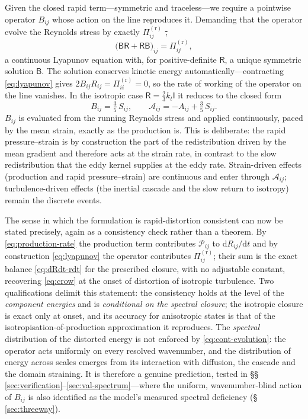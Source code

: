 \documentclass[lineno]{JFM-FLM_Au}
\providecommand{\DIFadd}[1]{{\protect\color{blue}\uwave{#1}}} %
\providecommand{\DIFdel}[1]{{\protect\color{red}\sout{#1}}} %
\providecommand{\DIFaddbegin}{} %
\providecommand{\DIFaddend}{} %
\providecommand{\DIFdelbegin}{} %
\providecommand{\DIFdelend}{} %
\begin{document}
Given the closed rapid term---symmetric and traceless---we require a
pointwise operator $B_{ij}$ whose action on the line reproduces it.
Demanding that the operator evolve the Reynolds stress by exactly
$\Pi^{(\mathrm r)}_{ij}$ \DIFdelbegin \DIFdel{,
}\DIFdelend \DIFaddbegin \DIFadd{implies
}\DIFaddend \begin{equation}
  \big(\mathsf{B}\mathsf{R}+\mathsf{R}\mathsf{B}\big)_{ij}
  = \Pi^{(\mathrm r)}_{ij},
  \label{eq:lyapunov}
\end{equation}
a continuous Lyapunov equation with, for positive-definite
$\mathsf{R}$, a unique symmetric solution $\mathsf{B}$. The solution
conserves kinetic energy automatically---contracting \eqref{eq:lyapunov}
gives $2B_{ij}R_{ij}=\Pi^{(\mathrm r)}_{ii}=0$, so the rate of working of
the operator on the line vanishes. In the isotropic case
$\mathsf{R}=\tfrac23k_t\mathsf{I}$ it reduces to the closed form
\begin{equation}
  B_{ij} = \tfrac{3}{5}\,S_{ij},
  \qquad
  \mathcal{A}_{ij} = -A_{ij} + \tfrac{3}{5}\,S_{ij}.
  \label{eq:iso-B}
\end{equation}
$B_{ij}$ is evaluated from the running Reynolds stress and applied
continuously, paced by the mean strain, exactly as the production is.
This is deliberate: the rapid pressure--strain is by construction the
part of the redistribution driven by the mean gradient and therefore acts
at the strain rate, in contrast to the slow redistribution that the eddy
kernel supplies at the eddy rate. Strain-driven effects (production and
rapid pressure--strain) are continuous and enter through
$\mathcal{A}_{ij}$; turbulence-driven effects (the inertial cascade and
the slow return to isotropy) remain the discrete events.

The sense in which the formulation is rapid-distortion consistent can now
be stated precisely, again as a consistency check rather than a theorem.
By \eqref{eq:production-rate} the production term contributes
$\mathcal{P}_{ij}$ to $\mathrm{d}R_{ij}/\mathrm{d}t$ and by construction
\eqref{eq:lyapunov} the operator contributes $\Pi^{(\mathrm r)}_{ij}$;
their sum is the exact balance \eqref{eq:dRdt-rdt} for the prescribed
closure, with no adjustable constant, recovering \eqref{eq:crow} at the
onset of distortion of isotropic turbulence. Two qualifications delimit
this statement: the consistency holds at the level of the
\emph{component energies} and is \emph{conditional on the
spectral closure}; the isotropic closure is exact only at onset, and its
accuracy for anisotropic states is that of the
isotropisation-of-production approximation it reproduces. The
\emph{spectral} distribution of the distorted energy is not enforced by
\eqref{eq:cont-evolution}: the operator acts uniformly on every resolved
wavenumber, and the distribution of energy across scales emerges from
its interaction with diffusion, the cascade and the domain straining. It
is therefore a genuine prediction, tested in
\S\S\,\ref{sec:verification}--\ref{sec:val-spectrum}---where the
uniform, wavenumber-blind action of $B_{ij}$ is also identified as the
model's measured spectral deficiency (\S\,\ref{sec:threeway}).
\end{document}
